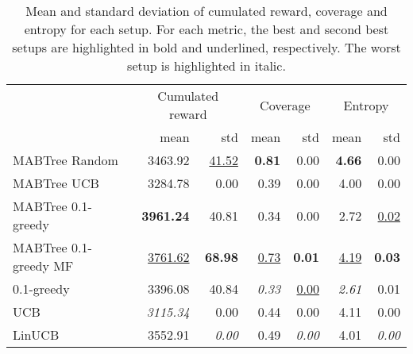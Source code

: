 \begin{table}[H]
\centering
\caption{Mean and standard deviation of cumulated reward, coverage and entropy for each setup. For each metric, the best and second best setups are highlighted in bold and underlined, respectively. The worst setup is highlighted in italic.}
\label{tab:summary}
\begin{tabular}{lrrrrrr}
\toprule
 & \multicolumn{2}{c}{Cumulated reward} & \multicolumn{2}{c}{Coverage} & \multicolumn{2}{c}{Entropy} \\
 & mean & std & mean & std & mean & std \\
\midrule
MABTree Random & 3463.92 & \underline{41.52} & \textbf{0.81} & 0.00 & \textbf{4.66} & 0.00 \\
MABTree UCB & 3284.78 & 0.00 & 0.39 & 0.00 & 4.00 & 0.00 \\
MABTree 0.1-greedy & \textbf{3961.24} & 40.81 & 0.34 & 0.00 & 2.72 & \underline{0.02} \\
MABTree 0.1-greedy MF & \underline{3761.62} & \textbf{68.98} & \underline{0.73} & \textbf{0.01} & \underline{4.19} & \textbf{0.03} \\
0.1-greedy & 3396.08 & 40.84 & \textit{0.33} & \underline{0.00} & \textit{2.61} & 0.01 \\
UCB & \textit{3115.34} & 0.00 & 0.44 & 0.00 & 4.11 & 0.00 \\
LinUCB & 3552.91 & \textit{0.00} & 0.49 & \textit{0.00} & 4.01 & \textit{0.00} \\
\bottomrule
\end{tabular}
\end{table}
